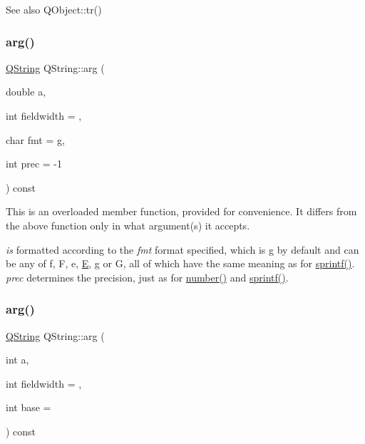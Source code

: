 \begin{DoxySeeAlso}{See also}
Q\+Object\+::tr() 
\end{DoxySeeAlso}
\mbox{\label{class_q_string_a6b112797e9accc6a76ec0f8eee68f98f}} 
\subsubsection{\texorpdfstring{arg()}{arg()}\hspace{0.1cm}{\footnotesize\ttfamily [3/10]}}
{\footnotesize\ttfamily \mbox{\hyperlink{class_q_string}{Q\+String}} Q\+String\+::arg (\begin{DoxyParamCaption}\item[{double}]{a,  }\item[{int}]{fieldwidth = {},  }\item[{char}]{fmt = {\ttfamily \textquotesingle{}g\textquotesingle{}},  }\item[{int}]{prec = {\ttfamily -\/1} }\end{DoxyParamCaption}) const}

This is an overloaded member function, provided for convenience. It differs from the above function only in what argument(s) it accepts.

{\itshape is} formatted according to the {\itshape fmt} format specified, which is \textquotesingle{}g\textquotesingle{} by default and can be any of \textquotesingle{}f\textquotesingle{}, \textquotesingle{}F\textquotesingle{}, \textquotesingle{}e\textquotesingle{}, \textquotesingle{}\mbox{\hyperlink{class_e}{E}}\textquotesingle{}, \textquotesingle{}g\textquotesingle{} or \textquotesingle{}G\textquotesingle{}, all of which have the same meaning as for \mbox{\hyperlink{class_q_string_a0b6622a8335cdd080e8b1685b7e0fde0}{sprintf()}}. {\itshape prec} determines the precision, just as for \mbox{\hyperlink{class_q_string_ac6eeb4543ef6aa8e4b165ed947039cd8}{number()}} and \mbox{\hyperlink{class_q_string_a0b6622a8335cdd080e8b1685b7e0fde0}{sprintf()}}. \mbox{\label{class_q_string_a6c3b33e3eb30057769fb89490a20de5e}} 
\subsubsection{\texorpdfstring{arg()}{arg()}\hspace{0.1cm}{\footnotesize\ttfamily [4/10]}}
{\footnotesize\ttfamily \mbox{\hyperlink{class_q_string}{Q\+String}} Q\+String\+::arg (\begin{DoxyParamCaption}\item[{int}]{a,  }\item[{int}]{fieldwidth = {},  }\item[{int}]{base = {} }\end{DoxyParamCaption}) const\hspace{0.3cm}{\ttfamily [inline]}}

